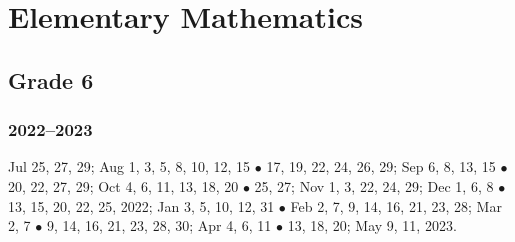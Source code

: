 \documentclass{article}
\begin{document}

\section{Elementary Mathematics}

\subsection{Grade 6}

\subsubsection{2022--2023}
Jul 25, 27, 29; Aug 1, 3, 5, 8, 10, 12, 15 $\bullet$ 17, 19, 22, 24, 26, 29; Sep 6, 8, 13, 15 $\bullet$ 20, 22, 27, 29; Oct 4, 6, 11, 13, 18, 20 $\bullet$ 25, 27; Nov 1, 3, 22, 24, 29; Dec 1, 6, 8 $\bullet$ 13, 15, 20, 22, 25, 2022; Jan 3, 5, 10, 12, 31 $\bullet$ Feb 2, 7, 9, 14, 16, 21, 23, 28; Mar 2, 7 $\bullet$ 9, 14, 16, 21, 23, 28, 30; Apr 4, 6, 11 $\bullet$ 13, 18, 20; May 9, 11, 2023.
\end{document}

